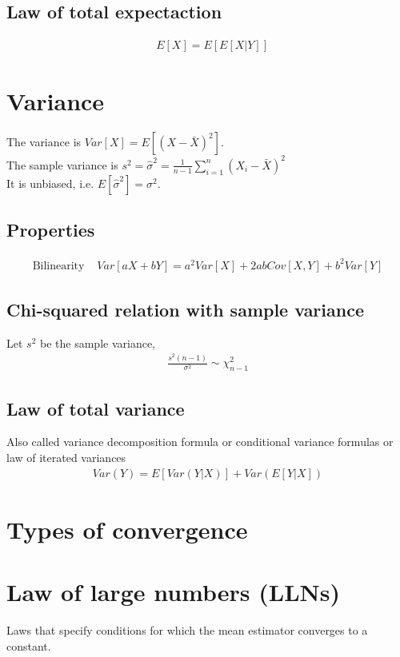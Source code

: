 \documentclass[../main.tex]{subfiles}
\begin{document}
\subsection{Law of total expectaction}
\begin{align*}
    &E[X] = E[E[X|Y]]
\end{align*}

\section{Variance}
The variance is $Var[X] = E[(X - \bar{X})^2]$. \\
The sample variance is $s^2 = \hat{\sigma}^2 = \frac{1}{n-1} \sum_{i=1}^{n}{(X_i - \bar{X})^2}$ \\
It is unbiased, i.e. $E[\hat{\sigma}^2] = \sigma^2$.

\subsection{Properties}
\begin{align*}
    \text{Bilinearity }&Var[aX + bY] = a^2Var[X] + 2abCov[X, Y] + b^2 Var[Y]
\end{align*}

\subsection{Chi-squared relation with sample variance}
Let $s^2$ be the sample variance,
\begin{align*}
    \frac{s^2(n-1)}{\sigma^2} \sim \chi_{n-1}^2
\end{align*}

\subsection{Law of total variance}
Also called variance decomposition formula or conditional variance formulas or law of iterated variances
\begin{align*}
    Var(Y) = E[Var(Y | X)] + Var(E[Y | X])
\end{align*}

\section{Types of convergence}

\section{Law of large numbers (LLNs)}
Laws that specify conditions for which the mean estimator converges to a constant.
\end{document}
